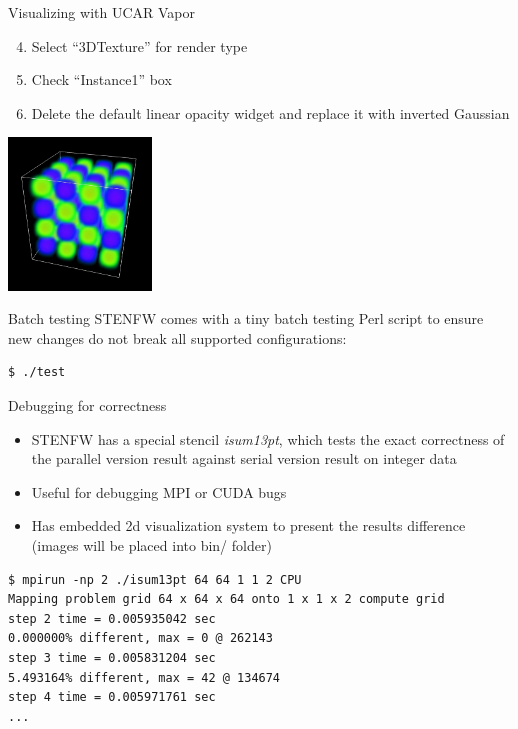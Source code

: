 \documentclass{beamer}
\begin{document}
\begin{frame}[fragile]{Visualizing with UCAR Vapor}
\begin{enumerate}
\setcounter{enumi}{3}
\item Select ``3DTexture'' for render type
\item Check ``Instance1'' box
\item Delete the default linear opacity widget and replace it with inverted Gaussian
\end{enumerate}
\begin{center}
\includegraphics[width=3.8cm]{wave13pt}
\end{center}
\end{frame}

\begin{frame}[fragile]{Batch testing}
STENFW comes with a tiny batch testing Perl script to ensure new changes do not break all supported configurations:
\begin{lstlisting}
$ ./test
\end{lstlisting}
\end{frame}

\begin{frame}[fragile]{Debugging for correctness}
\begin{itemize}
\item STENFW has a special stencil \emph{isum13pt}, which tests the exact correctness of the parallel version result against serial version result on integer data
\item Useful for debugging MPI or CUDA bugs
\item Has embedded 2d visualization system to present the results difference (images will be placed into bin/ folder)
\end{itemize}
\begin{lstlisting}
$ mpirun -np 2 ./isum13pt 64 64 1 1 2 CPU
Mapping problem grid 64 x 64 x 64 onto 1 x 1 x 2 compute grid
step 2 time = 0.005935042 sec
0.000000% different, max = 0 @ 262143
step 3 time = 0.005831204 sec
5.493164% different, max = 42 @ 134674
step 4 time = 0.005971761 sec
...
\end{lstlisting}
\end{frame}
\end{document}
